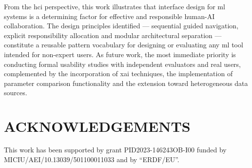 \documentclass[a4paper,twoside]{article}
\begin{document}
From the \gls{hci} perspective, this work illustrates that interface design  
for \gls{ml} systems is a determining factor for effective and responsible  
human-AI collaboration. The design principles identified --- sequential  
guided navigation, explicit responsibility allocation and modular  
architectural separation --- constitute a reusable pattern vocabulary for  
designing or evaluating any \gls{ml} tool intended for non-expert users.  
As future work, the most immediate priority is conducting formal usability  
studies with independent evaluators and real users,  
complemented by the incorporation of \gls{xai} techniques, the implementation  
of parameter comparison functionality and the extension toward heterogeneous  
data sources.


\section*{\uppercase{Acknowledgements}}

\small This work has been supported by grant  PID2023-146243OB-I00 funded by MICIU/AEI/10.13039/501100011033 and by ``ERDF/EU''.


{\small
}
\end{document}
